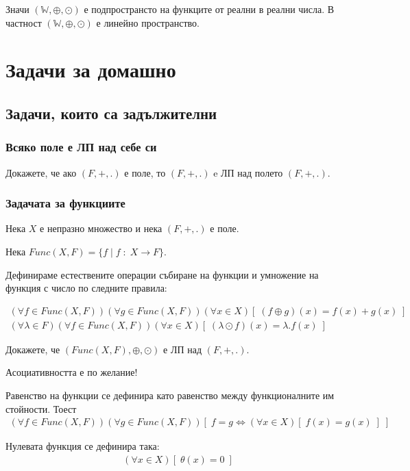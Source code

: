 \documentclass{article}[12pt]
\begin{document}
Значи \((\mathbb{W}, \oplus, \odot)\) е подпространсто на функците от реални в реални числа.
В частност \((\mathbb{W}, \oplus, \odot)\) е линейно пространство.

\section{Задачи за домашно}

\subsection{Задачи, които са задължителни}

\subsubsection{Всяко поле е ЛП над себе си}

Докажете, че ако \((F, +, .)\) е поле, то \((F, +, .)\) e ЛП над полето \((F, +, .)\).

\subsubsection{Задачата за функциите}

Нека \(X\) е непразно множество и нека \((F, +, .)\) е поле.

Нека \(Func(X, F) = \{f \; | \; f \; : \; X \to F\}\).

Дефинираме естествените операции събиране на функции и умножение на функция с число по следните правила:

\begin{align*}
(\forall f \in Func(X, F))(\forall g \in Func(X, F))(\forall x \in X)[\; (f \oplus g)(x) = f(x) + g(x) \;] \\
(\forall \lambda \in F)(\forall f \in Func(X, F))(\forall x \in X)[\; (\lambda \odot f)(x) = \lambda.f(x) \;]
\end{align*}

Докажете, че \((Func(X, F), \oplus, \odot)\) е ЛП над \((F, +, .)\).


Асоциативността е по желание!

Равенство на функции се дефинира като равенство между функционалните им стойности. Тоест
\begin{align*}
(\forall f \in Func(X, F))(\forall g \in Func(X, F))[\; f = g \iff (\forall x \in X)[\; f(x) = g(x) \;] \; ]
\end{align*}

Нулевата функция се дефинира така:
\begin{align*}
(\forall x \in X)[\; \theta(x) = 0 \;] 
\end{align*}
\end{document}
